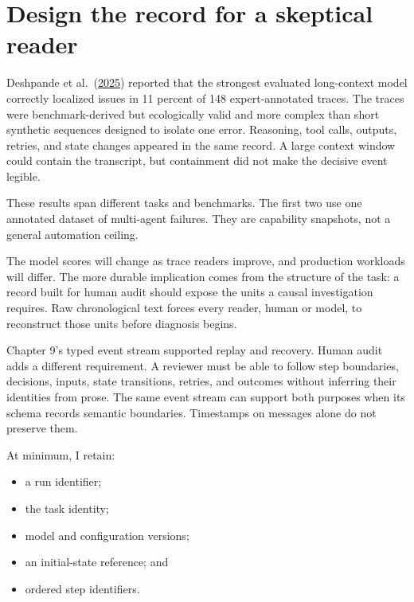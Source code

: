 \hypertarget{design-the-record-for-a-skeptical-reader}{%
\section{Design the record for a skeptical reader}\label{design-the-record-for-a-skeptical-reader}}

Deshpande et al.~(\href{https://arxiv.org/abs/2505.08638}{2025}) reported that the strongest evaluated long-context model correctly localized issues in 11 percent of 148 expert-annotated traces. The traces were benchmark-derived but ecologically valid and more complex than short synthetic sequences designed to isolate one error. Reasoning, tool calls, outputs, retries, and state changes appeared in the same record. A large context window could contain the transcript, but containment did not make the decisive event legible.

These results span different tasks and benchmarks. The first two use one annotated dataset of multi-agent failures. They are capability snapshots, not a general automation ceiling.

The model scores will change as trace readers improve, and production workloads will differ. The more durable implication comes from the structure of the task: a record built for human audit should expose the units a causal investigation requires. Raw chronological text forces every reader, human or model, to reconstruct those units before diagnosis begins.

Chapter 9's typed event stream supported replay and recovery. Human audit adds a different requirement. A reviewer must be able to follow step boundaries, decisions, inputs, state transitions, retries, and outcomes without inferring their identities from prose. The same event stream can support both purposes when its schema records semantic boundaries. Timestamps on messages alone do not preserve them.


At minimum, I retain:

\begin{itemize}
\tightlist
\item
  a run identifier;
\item
  the task identity;
\item
  model and configuration versions;
\item
  an initial-state reference; and
\item
  ordered step identifiers.
\end{itemize}

